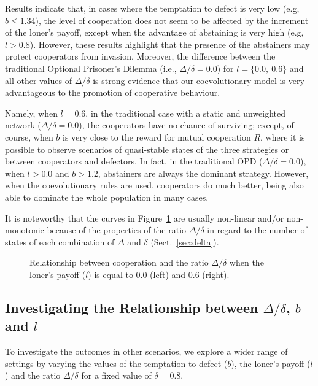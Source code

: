 \documentclass{llncs}
\begin{document}
Results indicate that, in cases where the temptation to defect is very
low (e.g, $b \le 1.34$), the level of cooperation does not seem to be affected
by the increment of the loner's payoff, except when the advantage of abstaining
is very high (e.g, $l>0.8$). However, these results highlight that the presence
of the abstainers may protect cooperators from invasion. Moreover, the
difference between the traditional Optional Prisoner's Dilemma (i.e.,
$\Delta/\delta=0.0$) for $l=\{0.0,\ 0.6\}$ and all other values of
$\Delta/\delta$ is strong evidence that our coevolutionary model is very
advantageous to the promotion of cooperative behaviour.

Namely, when $l=0.6$, in the traditional case with a static and unweighted
network ($\Delta/\delta=0.0$), the cooperators have no chance of surviving;
except, of course, when $b$ is very close to the reward for mutual cooperation
$R$, where it is possible to observe scenarios of quasi-stable states of the
three strategies or between cooperators and defectors. In fact, in the
traditional OPD ($\Delta/\delta=0.0$), when $l>0.0$ and $b>1.2$, abstainers
are always the dominant strategy. However, when the coevolutionary rules are
used, cooperators do much better, being also able to dominate the whole
population in many cases.

It is noteworthy that the curves in Figure~\ref{fig:c_amp} are usually
non-linear and/or non-monotonic because of the properties of the ratio
$\Delta/\delta$ in regard to the number of states of each combination
of $\Delta$ and $\delta$ (Sect.~\ref{sec:delta}).

\begin{figure}[tb]
    \centering
    {}
    {}
    \caption{
        Relationship between cooperation and the ratio $\Delta/\delta$ when
        the loner's payoff ($l$) is equal to $0.0$ (left) and $0.6$ (right).
    }
    \label{fig:c_amp}
\end{figure}


\subsection{Investigating the Relationship between $\Delta/\delta$, $b$ and $l$}
\label{sec:varyall}

To investigate the outcomes in other scenarios, we explore a wider range of
settings by varying the values of the temptation to defect ($b$), the loner's
payoff ($l$) and the ratio $\Delta/\delta$ for a fixed value of $\delta = 0.8$.
\end{document}
